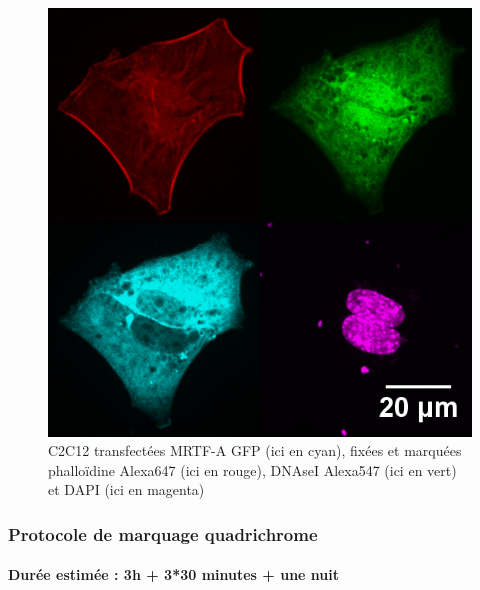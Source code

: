 \documentclass{report}
\begin{document}
				
		\begin{figure}
		\includegraphics[scale=0.4]{Montage_sc.png}
		\caption{C2C12 transfectées MRTF-A GFP (ici en cyan), fixées et marquées phalloïdine Alexa647 (ici en rouge), DNAseI Alexa547 (ici en vert) et DAPI (ici en magenta)}
		\end{figure}

\subsubsection{Protocole de marquage quadrichrome}
\paragraph{Durée estimée : 3h + 3*30 minutes + une nuit }
\end{document}
